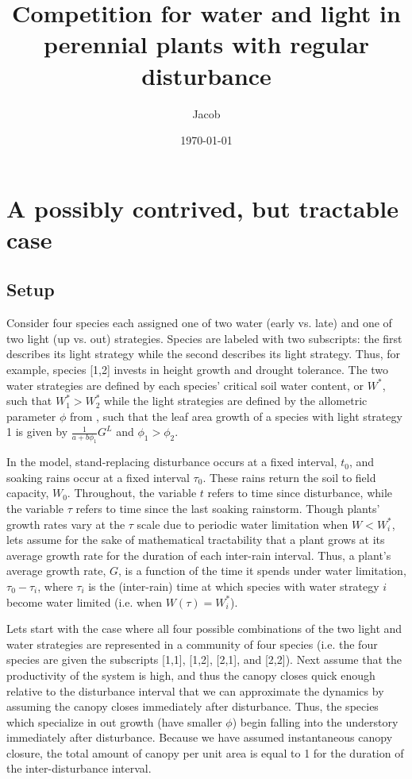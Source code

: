 \documentclass[11pt]{article}
\author{Jacob}
\date{\today}
\title{Competition for water and light in perennial plants with regular disturbance}
\begin{document}
\maketitle
\tableofcontents



\section{A possibly contrived, but tractable case}
\label{sec:org10e6833}

\subsection{Setup}
\label{sec:orge2f2e97}

Consider four species each assigned one of two water (early vs. late) and one of two light (up vs. out) strategies. Species are labeled with two subscripts: the first describes its light strategy while the second describes its light strategy. Thus, for example, species [1,2] invests in height growth and drought tolerance. The two water strategies are defined by each species' critical soil water content, or \(W^*\), such that \(W_1^* > W_2^*\) while the light strategies are defined by the allometric parameter \(\phi\) from \cite{dettoMaintenanceHighDiversity2021a}, such that the leaf area growth of a species with light strategy 1 is given by \(\frac{1}{a + b \phi_1} G^L\) and \(\phi_1 > \phi_2\).

In the model, stand-replacing disturbance occurs at a fixed interval, \(t_0\), and soaking rains occur at a fixed interval \(\tau_0\). These rains return the soil to field capacity, \(W_0\). Throughout, the variable \(t\) refers to time since disturbance, while the variable \(\tau\) refers to time since the last soaking rainstorm. Though plants' growth rates vary at the \(\tau\) scale due to periodic water limitation when \(W < W_i^*\), lets assume for the sake of mathematical tractability that a plant grows at its average growth rate for the duration of each inter-rain interval. Thus, a plant's average growth rate, \(G\), is a function of the time it spends under water limitation, \(\tau_0 - \tau_i\), where \(\tau_i\) is the (inter-rain) time at which species with water strategy \(i\) become water limited (i.e. when \(W(\tau) = W_i^*\)).

Lets start with the case where all four possible combinations of the two light and water strategies are represented in a community of four species (i.e. the four species are given the subscripts [1,1], [1,2], [2,1], and [2,2]). Next assume that the productivity of the system is high, and thus the canopy closes quick enough relative to the disturbance interval that we can approximate the dynamics by assuming the canopy closes immediately after disturbance. Thus, the species which specialize in out growth (have smaller \(\phi\)) begin falling into the understory immediately after disturbance. Because we have assumed instantaneous canopy closure, the total amount of canopy per unit area is equal to 1 for the duration of the inter-disturbance interval.
\end{document}
